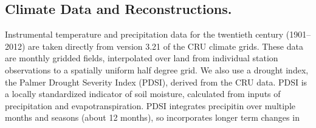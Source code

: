 \documentclass[final]{nature}
\begin{document}
\begin{methods}
\subsection{Climate Data and Reconstructions.}
\noindent Instrumental temperature and precipitation data for the twentieth century (1901--2012) are taken directly from version 3.21 of the CRU climate grids\cite{Harris2014}. These data are monthly gridded fields, interpolated over land from individual station observations to a spatially uniform half degree grid. We also use a drought index, the Palmer Drought Severity Index (PDSI\cite{Palmer:1965}), derived from the CRU data\cite{Schrier2013}. PDSI is a locally standardized indicator of soil moisture, calculated from inputs of precipitation and evapotranspiration. PDSI integrates precipitin over multiple months and seasons (about 12 months), so incorporates longer term changes in 
\end{methods}






\end{document}
